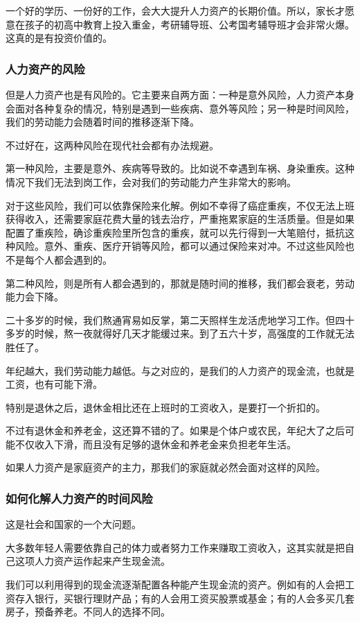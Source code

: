 一个好的学历、一份好的工作，会大大提升人力资产的长期价值。所以，家长才愿意在孩子的初高中教育上投入重金，考研辅导班、公考国考辅导班才会非常火爆。这真的是有投资价值的。

\subsubsection{人力资产的风险}

但是人力资产也是有风险的。它主要来自两方面：一种是意外风险，人力资产本身会面对各种复杂的情况，特别是遇到一些疾病、意外等风险；另一种是时间风险，我们的劳动能力会随着时间的推移逐渐下降。

不过好在，这两种风险在现代社会都有办法规避。

第一种风险，主要是意外、疾病等导致的。比如说不幸遇到车祸、身染重疾。这种情况下我们无法到岗工作，会对我们的劳动能力产生非常大的影响。

对于这些风险，我们可以依靠保险来化解。例如不幸得了癌症重疾，不仅无法上班获得收入，还需要家庭花费大量的钱去治疗，严重拖累家庭的生活质量。但是如果配置了重疾险，确诊重疾险里所包含的重疾，就可以先行得到一大笔赔付，抵抗这种风险。意外、重疾、医疗开销等风险，都可以通过保险来对冲。不过这些风险也不是每个人都会遇到的。

第二种风险，则是所有人都会遇到的，那就是随时间的推移，我们都会衰老，劳动能力会下降。

二十多岁的时候，我们熬通宵易如反掌，第二天照样生龙活虎地学习工作。但四十多岁的时候，熬一夜就得好几天才能缓过来。到了五六十岁，高强度的工作就无法胜任了。

年纪越大，我们劳动能力越低。与之对应的，是我们的人力资产的现金流，也就是工资，也有可能下滑。

特别是退休之后，退休金相比还在上班时的工资收入，是要打一个折扣的。

不过有退休金和养老金，这还算不错的了。如果是个体户或农民，年纪大了之后可能不仅收入下滑，而且没有足够的退休金和养老金来负担老年生活。

如果人力资产是家庭资产的主力，那我们的家庭就必然会面对这样的风险。

\subsubsection{如何化解人力资产的时间风险}

这是社会和国家的一个大问题。

大多数年轻人需要依靠自己的体力或者努力工作来赚取工资收入，这其实就是把自己这项人力资产运作起来产生现金流。

我们可以利用得到的现金流逐渐配置各种能产生现金流的资产。例如有的人会把工资存入银行，买银行理财产品；有的人会用工资买股票或基金；有的人会多买几套房子，预备养老。不同人的选择不同。

